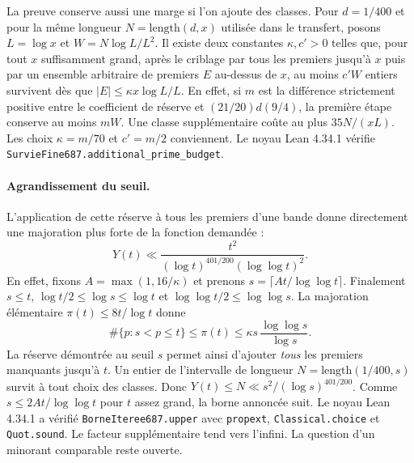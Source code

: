 \documentclass[11pt,a4paper]{article}
\begin{document}
La preuve conserve aussi une marge si l'on ajoute des classes.
Pour $d=1/400$ et pour la même longueur $N=\mathrm{length}(d,x)$
utilisée dans le transfert, posons $L=\log x$ et
$W=N\log L/L^2$. Il existe deux constantes $\kappa,c'>0$ telles que,
pour tout $x$ suffisamment grand, après le criblage par tous les
premiers jusqu'à $x$ puis par un ensemble arbitraire de premiers $E$
au-dessus de $x$, au moins $c'W$ entiers survivent dès que
$|E|\le\kappa x\log L/L$. En effet, si $m$ est la différence strictement
positive entre le coefficient de réserve et $(21/20)d(9/4)$,
la première étape conserve au moins $mW$. Une classe supplémentaire coûte
au plus $35N/(xL)$. Les choix $\kappa=m/70$ et $c'=m/2$ conviennent.
Le noyau Lean 4.34.1 vérifie \texttt{SurvieFine687.additional\_prime\_budget}.

\paragraph{Agrandissement du seuil.}
L'application de cette réserve à tous les premiers d'une bande donne
directement une majoration plus forte de la fonction demandée :
\[
 Y(t)\ll \frac{t^2}{(\log t)^{401/200}(\log\log t)^2}.
\]
En effet, fixons $A=\max(1,16/\kappa)$ et prenons
$s=\lceil At/\log\log t\rceil$. Finalement $s\le t$,
$\log t/2\le\log s\le\log t$ et
$\log\log t/2\le\log\log s$. La majoration élémentaire
$\pi(t)\le8t/\log t$ donne
\[
   \#\{p:s<p\le t\}\le \pi(t)
       \le \kappa s\,\frac{\log\log s}{\log s}.
\]
La réserve démontrée au seuil $s$ permet ainsi d'ajouter \emph{tous}
les premiers manquants jusqu'à $t$. Un entier de l'intervalle de
longueur $N=\mathrm{length}(1/400,s)$ survit à tout choix des classes.
Donc $Y(t)\le N\ll s^2/(\log s)^{401/200}$. Comme
$s\le2At/\log\log t$ pour $t$ assez grand, la borne annoncée suit.
Le noyau Lean 4.34.1 a vérifié \texttt{BorneIteree687.upper} avec
\texttt{propext}, \texttt{Classical.choice} et \texttt{Quot.sound}.
Le facteur supplémentaire tend vers l'infini. La question d'un
minorant comparable reste ouverte.
\end{document}
